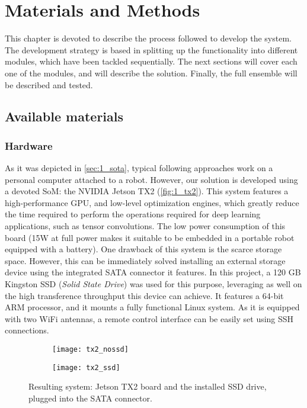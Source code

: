 \chapter{Materials and Methods}
\label{chap:2_materials_methods}
This chapter is devoted to describe the process followed to develop the system. The development strategy is based in splitting up the functionality into different modules, which have been tackled sequentially. The next sections will cover each one of the modules, and will describe the solution. Finally, the full ensemble will be described and tested.\\


\section{Available materials}
\label{sec:2_materials}
\subsection{Hardware}

As it was depicted in \autoref{sec:1_sota}, typical following approaches work on a personal computer attached to a robot. However, our solution is developed using a devoted SoM: the NVIDIA Jetson TX2 (\autoref{fig:1_tx2}). This system features a high-performance GPU, and low-level optimization engines, which greatly reduce the time required to perform the operations required for deep learning applications, such as tensor convolutions. The low power consumption of this board (15W at full power makes it suitable to be embedded in a portable robot equipped with a battery). One drawback of this system is the scarce storage space. However, this can be immediately solved installing an external storage device using the integrated SATA connector it features. In this project, a 120 GB Kingston SSD (\textit{Solid State Drive}) was used for this purpose, leveraging as well on the high transference throughput this device can achieve. It features a 64-bit ARM processor, and it mounts a fully functional Linux system. As it is equipped with two WiFi antennas, a remote control interface can be easily set using SSH connections.\\

\begin{figure}[h]
	\begin{subfigure}[h]{0.45\linewidth}
		\centering
		\texttt{[image: tx2\_nossd]}
	\end{subfigure}
	\begin{subfigure}[h]{0.45\linewidth}
		\centering
		\texttt{[image: tx2\_ssd]}
	\end{subfigure}
	\caption{Resulting system: Jetson TX2 board and the installed SSD drive, plugged into the SATA connector.}
	\label{fig:2_mytx2}
\end{figure}

